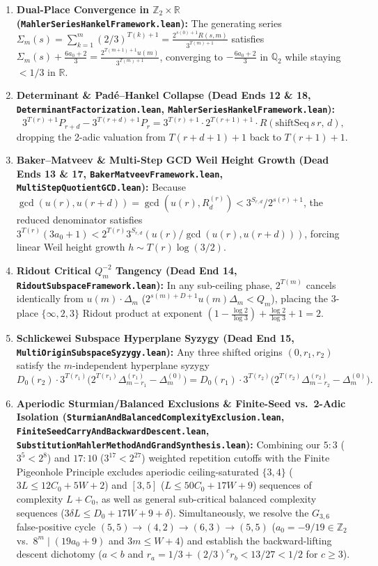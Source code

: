 \documentclass[11pt]{article}
\begin{document}
\begin{enumerate}
  \item \textbf{Dual-Place Convergence in $\mathbb{Z}_2 \times \mathbb{R}$ (\texttt{MahlerSeriesHankelFramework.lean}):} The generating series $\Sigma_m(s) = \sum_{k=1}^m (2/3)^{T(k)+1} = \frac{2^{s(0)+1} R(s, m)}{3^{T(m)+1}}$ satisfies $\Sigma_m(s) + \frac{6a_0+2}{3} = \frac{2^{T(m+1)+1} u(m)}{3^{T(m)+1}}$, converging to $-\frac{6a_0+2}{3}$ in $\mathbb{Q}_2$ while staying $< 1/3$ in $\mathbb{R}$.
  \item \textbf{Determinant \& Pad\'e--Hankel Collapse (Dead Ends 12 \& 18, \texttt{DeterminantFactorization.lean}, \texttt{MahlerSeriesHankelFramework.lean}):}
  \[
    3^{T(r)+1} P_{r+d} - 3^{T(r+d)+1} P_r = 3^{T(r)+1} \cdot 2^{T(r+1)+1} \cdot R(\mathrm{shiftSeq}\, s\, r,\, d),
  \]
  dropping the 2-adic valuation from $T(r+d+1)+1$ back to $T(r+1)+1$.
  \item \textbf{Baker--Matveev \& Multi-Step GCD Weil Height Growth (Dead Ends 13 \& 17, \texttt{BakerMatveevFramework.lean}, \texttt{MultiStepQuotientGCD.lean}):} Because $\gcd(u(r), u(r+d)) = \gcd(u(r), R^{(r)}_d) < 3^{S_{r, d}} / 2^{s(r)+1}$, the reduced denominator satisfies $3^{T(r)}(3a_0 + 1) < 2^{T(r)} 3^{S_{r, d}} (u(r)/\gcd(u(r), u(r+d)))$, forcing linear Weil height growth $h \sim T(r)\log(3/2)$.
  \item \textbf{Ridout Critical $Q_m^{-2}$ Tangency (Dead End 14, \texttt{RidoutSubspaceFramework.lean}):} In any sub-ceiling phase, $2^{T(m)}$ cancels identically from $u(m) \cdot \Delta_m$ ($2^{s(m)+D+1} u(m) \Delta_m < Q_m$), placing the 3-place $\{\infty, 2, 3\}$ Ridout product at exponent $(1 - \frac{\log 2}{\log 3}) + \frac{\log 2}{\log 3} + 1 = 2$.
  \item \textbf{Schlickewei Subspace Hyperplane Syzygy (Dead End 15, \texttt{MultiOriginSubspaceSyzygy.lean}):} Any three shifted origins $(0, r_1, r_2)$ satisfy the $m$-independent hyperplane syzygy
  \[
    D_0(r_2) \cdot 3^{T(r_1)} \big(2^{T(r_1)} \Delta^{(r_1)}_{m - r_1} - \Delta^{(0)}_m\big) = D_0(r_1) \cdot 3^{T(r_2)} \big(2^{T(r_2)} \Delta^{(r_2)}_{m - r_2} - \Delta^{(0)}_m\big).
  \]
  \item \textbf{Aperiodic Sturmian/Balanced Exclusions \& Finite-Seed vs.\ 2-Adic Isolation (\texttt{SturmianAndBalancedComplexityExclusion.lean}, \texttt{FiniteSeedCarryAndBackwardDescent.lean}, \texttt{SubstitutionMahlerMethodAndGrandSynthesis.lean}):} Combining our $5:3$ ($3^5 < 2^8$) and $17:10$ ($3^{17} < 2^{27}$) weighted repetition cutoffs with the Finite Pigeonhole Principle excludes aperiodic ceiling-saturated $\{3, 4\}$ ($3L \le 12 C_0 + 5W + 2$) and $[3, 5]$ ($L \le 50 C_0 + 17W + 9$) sequences of complexity $L + C_0$, as well as general sub-critical balanced complexity sequences ($3\delta L \le D_0 + 17W + 9 + \delta$). Simultaneously, we resolve the $G_{3,6}$ false-positive cycle $(5,5)\to(4,2)\to(6,3)\to(5,5)$ ($a_0 = -9/19 \in \mathbb{Z}_2$ vs.\ $8^m \mid (19 a_0 + 9)$ and $3m \le W + 4$) and establish the backward-lifting descent dichotomy ($a < b$ and $r_a = 1/3 + (2/3)^c r_b < 13/27 < 1/2$ for $c \ge 3$).

\end{enumerate}
\end{document}
